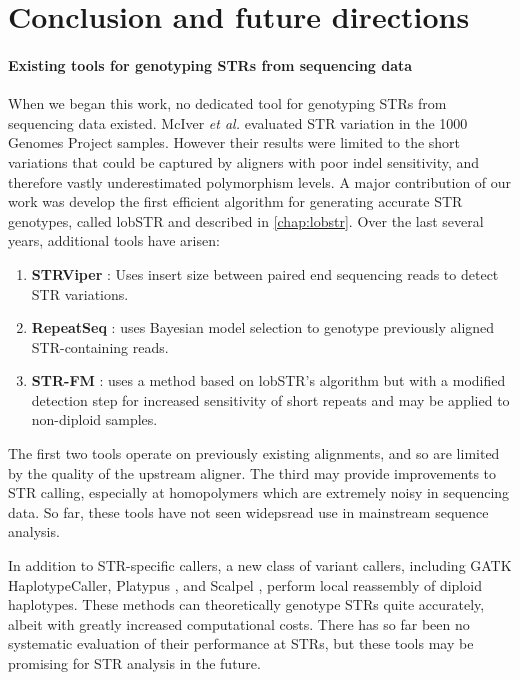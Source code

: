 \chapter{Conclusion and future directions}
\label{chap:conc}


\subsubsection{Existing tools for genotyping STRs from sequencing data}
When we began this work, no dedicated tool for genotyping STRs from sequencing data existed. McIver \emph{et al.} \cite{McIverFondonSkinnerEtAl2011} evaluated STR variation in the 1000 Genomes Project \cite{AbecasisAltshulerAutonEtAl2010} samples. However their results were limited to the short variations that could be captured by aligners with poor indel sensitivity, and therefore vastly underestimated polymorphism levels. A major contribution of our work was develop the first efficient algorithm for generating accurate STR genotypes, called lobSTR \cite{GymrekGolanRossetEtAl2012} and described in \autoref{chap:lobstr}. Over the last several years, additional tools have arisen:

\begin{enumerate}
\item \textbf{STRViper} \cite{CaoTaskerWilladsenEtAl2014}: Uses insert size between paired end sequencing reads to detect STR variations.
\item \textbf{RepeatSeq} \cite{HighnamFranckMartinEtAl2013}: uses Bayesian model selection to genotype previously aligned STR-containing reads.
\item \textbf{STR-FM} \cite{FungtammasanAnandaHileEtAl2015}: uses a method based on lobSTR's algorithm but with a modified detection step for increased sensitivity of short repeats and may be applied to non-diploid samples.
\end{enumerate}

The first two tools operate on previously existing alignments, and so are limited by the quality of the upstream aligner. The third may provide improvements to STR calling, especially at homopolymers which are extremely noisy in sequencing data. So far, these tools have not seen widepsread use in mainstream sequence analysis.

In addition to STR-specific callers, a new class of variant callers, including GATK \cite{McKennaHannaBanksEtAl2010} HaplotypeCaller, Platypus \cite{RimmerPhanMathiesonEtAl2014}, and Scalpel \cite{NarzisiOextquotesingleRaweIossifovEtAl2014}, perform local reassembly of diploid haplotypes. These methods can theoretically genotype STRs quite accurately, albeit with greatly increased computational costs. There has so far been no systematic evaluation of their performance at STRs, but these tools may be promising for STR analysis in the future.

